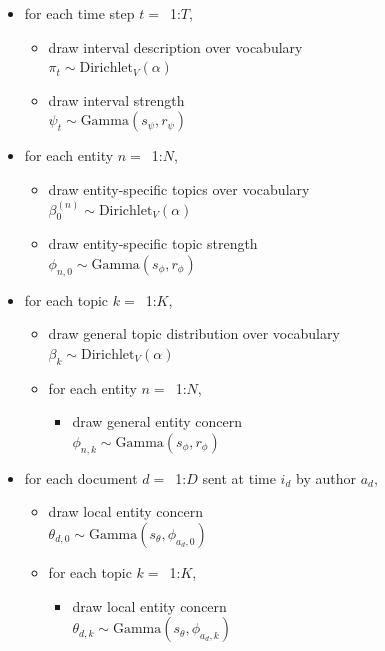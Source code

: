 \begin{figure}[htb]
\begin{mdframed}
\small
\begin{itemize}[leftmargin=*]
\item for each time step $t=$~1:$T$,
	\begin{itemize}[leftmargin=*]
	\item draw interval description over vocabulary \\$\pi_t \sim \mbox{Dirichlet}_V (\alpha)$
	\item draw interval strength \\$\psi_{t} \sim \mbox{Gamma}(s_\psi, r_\psi)$
	\end{itemize}
\item for each entity $n=$~1:$N$,
	\begin{itemize}[leftmargin=*]
	\item draw entity-specific topics over vocabulary \\$\beta^{(n)}_{0} \sim \mbox{Dirichlet}_V (\alpha)$
	\item draw entity-specific topic strength \\$\phi_{n,0} \sim \mbox{Gamma}(s_\phi, r_\phi)$
	\end{itemize}
\item for each topic $k=$~1:$K$,
	\begin{itemize}[leftmargin=*]
	\item draw general topic distribution over vocabulary \\$\beta_k \sim \mbox{Dirichlet}_V (\alpha)$
	\item for each entity $n=$~1:$N$,
		\begin{itemize}[leftmargin=*]
		\item draw general entity concern \\$\phi_{n,k} \sim \mbox{Gamma}(s_\phi, r_\phi)$
		\end{itemize}
	\end{itemize}
\item for each document $d=$~1:$D$ sent at time $i_d$ by author $a_d$,
	\begin{itemize}[leftmargin=*]
	\item draw local entity concern \\$\theta_{d,0} \sim \mbox{Gamma}(s_\theta, \phi_{a_d,0})$
	\item for each topic $k=$~1:$K$,
		\begin{itemize}[leftmargin=*]
			\item draw local entity concern \\$\theta_{d,k} \sim \mbox{Gamma}(s_\theta, \phi_{a_d,k})$

\end{itemize}
\end{itemize}
\end{itemize}
\end{mdframed}
\end{figure}
